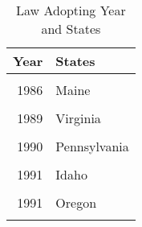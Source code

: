 \begin{table}[H]

\caption{\label{tab:tab:summarystats}Law Adopting Year and States}
\centering
\begin{tabular}[t]{rl}
\toprule
Year & States\\
\midrule
\cellcolor{gray!6}{1981} & \cellcolor{gray!6}{Indiana}\\
1986 & Maine\\
\cellcolor{gray!6}{1988} & \cellcolor{gray!6}{Florida}\\
1989 & Virginia\\
\cellcolor{gray!6}{1990} & \cellcolor{gray!6}{Georgia}\\
1990 & Pennsylvania\\
\cellcolor{gray!6}{1990} & \cellcolor{gray!6}{West Virginia}\\
1991 & Idaho\\
\cellcolor{gray!6}{1991} & \cellcolor{gray!6}{Mississippi}\\
1991 & Oregon\\
\cellcolor{gray!6}{1992} & \cellcolor{gray!6}{Montana}\\
\bottomrule
\end{tabular}
\end{table}